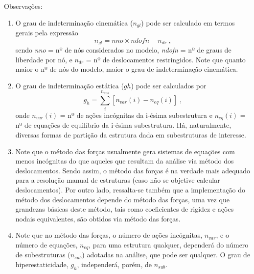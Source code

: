 Observações:
\begin{enumerate}
	\item
	      O grau de indeterminação cinemática ($n_{gl}$) pode ser calculado em termos gerais pela expressão \[ n_{gl}\!=\!nno\times ndofn - n_{dr} \; ,\] sendo
	      \textit{nno} = nº de nós considerados no modelo, \textit{ndofn} = nº de graus de liberdade por nó, e $n_{dr}$ = nº de deslocamentos restringidos. Note que quanto maior o nº de nós do modelo, maior o grau de indeterminação cinemática.

	\item
	      O grau de indeterminação estática ($gh$) pode ser calculados por
	      \[g_{h}=\sum_{i}^{n_{sub}}\left [ n_{var}(i)-n_{eq}(i) \right ] \; ,\] onde
	      $n_{var}(i)$ = nº de ações incógnitas da i-ésima subestrutura e $n_{eq}(i)$ = nº de equações de equilíbrio da i-ésima subestrutura.
	      Há, naturalmente, diversas formas de partição da estrutura dada em subestruturas de interesse.

	\item
	      Note que o método das forças usualmente gera sistemas de equações com menos incógnitas do que aqueles que resultam da análise via método dos deslocamentos. Sendo assim, o método das forças é na verdade mais adequado para a resolução manual de estruturas (caso não se objetive calcular deslocamentos). Por outro lado, ressalta-se também que a implementação do método dos deslocamentos depende do método das forças, uma vez que grandezas básicas deste método, tais como coeficientes de rigidez e ações nodais equivalentes, são obtidos via método das forças.

	\item
	      Note que no método das forças, o número de ações incógnitas, $n_{var}$, e o número de equações, $n_{eq}$, para uma estrutura qualquer, dependerá do número de subestruturas ($n_{sub}$) adotadas na análise, que pode ser qualquer. O grau de hiperestaticidade, $g_h$, independerá, porém, de $n_{sub}$.
\end{enumerate}
